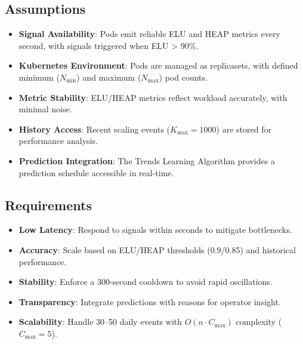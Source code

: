 \documentclass[12pt]{article}
\begin{document}
\subsection{Assumptions}
\begin{itemize}
    \item \textbf{Signal Availability}: Pods emit reliable ELU and HEAP metrics every second, with signals triggered when ELU > 90\%.
    \item \textbf{Kubernetes Environment}: Pods are managed as replicasets, with defined minimum ($N_{\text{min}}$) and maximum ($N_{\text{max}}$) pod counts.
    \item \textbf{Metric Stability}: ELU/HEAP metrics reflect workload accurately, with minimal noise.
    \item \textbf{History Access}: Recent scaling events ($K_{\text{max}} = 1000$) are stored for performance analysis.
    \item \textbf{Prediction Integration}: The Trends Learning Algorithm provides a prediction schedule accessible in real-time.
\end{itemize}

\subsection{Requirements}
\begin{itemize}
    \item \textbf{Low Latency}: Respond to signals within seconds to mitigate bottlenecks.
    \item \textbf{Accuracy}: Scale based on ELU/HEAP thresholds (0.9/0.85) and historical performance.
    \item \textbf{Stability}: Enforce a 300-second cooldown to avoid rapid oscillations.
    \item \textbf{Transparency}: Integrate predictions with reasons for operator insight.
    \item \textbf{Scalability}: Handle 30–50 daily events with $O(n \cdot C_{\text{max}})$ complexity ($C_{\text{max}} = 5$).
\end{itemize}
\end{document}
